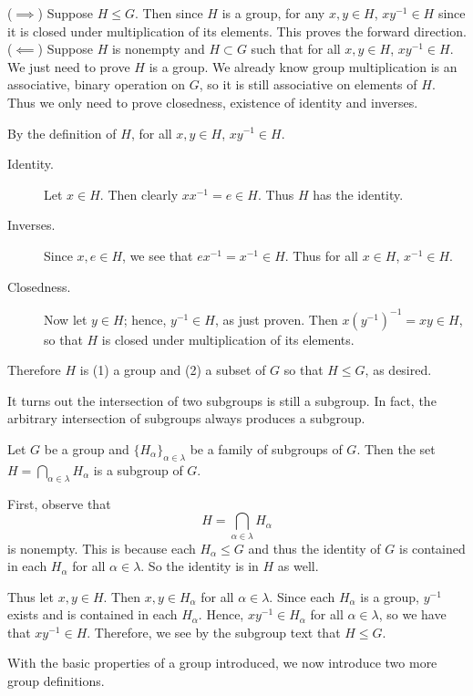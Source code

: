 \documentclass[12pt,letterpaper]{algebra_book}
\theoremstyle{definition}
\begin{document}
    \begin{prf}

        ($\implies$) Suppose $H \le G$. Then since $H$ is a group,
        for any $x, y \in H$, $xy^{-1} \in H$ since it is closed under
        multiplication of its elements. This proves the forward
        direction.
        \\
        
        ($\impliedby$) Suppose $H$ is nonempty and $H \subset G$ such
        that for all $x, y \in H$, $xy^{-1} \in H$. We just need to
        prove $H$ is a group. We already know group multiplication is
        an associative, binary operation on $G$, so it is still
        associative on elements of $H$. Thus we only need to prove
        closedness, existence of identity and inverses.
        
        By the definition of $H$, for all $x, y \in H$, $xy^{-1} \in
        H$. 
        \begin{description}
            \item[Identity.] Let $x \in H$. Then clearly $xx^{-1} = e \in H$. Thus $H$
            has the identity.
            \item[Inverses.] Since $x, e \in H$, we see that $ex^{-1} =
            x^{-1} \in H$. Thus for all $x \in H$, $x^{-1} \in H$.
            \item[Closedness.] Now let $y \in H$; hence, $y^{-1} \in H$, as just proven. Then
            $x(y^{-1})^{-1} = xy\in H$, so that $H$ is closed under
            multiplication of its elements.
        \end{description} 
        Therefore $H$ is (1) a group
        and (2) a subset of $G$ so that $H \le G$, as desired.
    \end{prf}

    It turns out the intersection of two subgroups is still a
    subgroup. In fact, the arbitrary intersection of subgroups always
    produces a subgroup. 
    \begin{thm}
        Let $G$ be a group and $\{H_\alpha\}_{\alpha \in \lambda}$ be
        a family of subgroups of $G$. Then the set $H =
        \bigcap_{\alpha \in \lambda} H_\alpha$ is a subgroup of $G$.
    \end{thm}

    \begin{prf}
        First, observe that 
        \[
            H = \bigcap_{\alpha \in \lambda} H_\alpha
        \]
        is nonempty. This is because each $H_\alpha \le G$ and thus
       the identity of $G$ is contained in each $H_\alpha$ for all
       $\alpha \in \lambda$. So the identity is in $H$ as well.

       Thus let $x, y \in H$. Then $x, y \in H_\alpha$ for all $\alpha
       \in \lambda$. Since each $H_\alpha$ is a group, $y^{-1}$ exists
       and is contained in each $H_\alpha$. Hence, $xy^{-1} \in
       H_\alpha$ for all $\alpha \in \lambda$, so we have that
       $xy^{-1} \in H$. Therefore, we see by the subgroup text that $H
       \le G$. 
    \end{prf}
    With the basic properties of a group introduced, we now introduce
    two more group definitions. 
\end{document}
